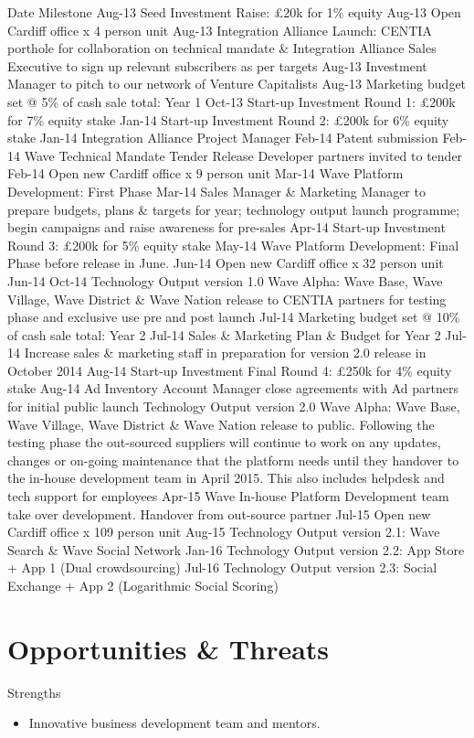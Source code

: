 \documentclass[letterpaper,10pt,openany,oneside,english]{sphinxmanual}
\begin{document}
Date Milestone
Aug-13 Seed Investment Raise: £20k for 1\% equity
Aug-13 Open Cardiff office x 4 person unit
Aug-13 Integration Alliance Launch: CENTIA porthole for collaboration on technical mandate \& Integration Alliance
Sales Executive to sign up relevant subscribers as per targets
Aug-13 Investment Manager to pitch to our network of Venture Capitalists
Aug-13 Marketing budget set @ 5\% of cash sale total: Year 1
Oct-13 Start-up Investment Round 1: £200k for 7\% equity stake
Jan-14 Start-up Investment Round 2: £200k for 6\% equity stake
Jan-14 Integration Alliance Project Manager
Feb-14 Patent submission
Feb-14 Wave Technical Mandate Tender Release \textendash{} Developer partners invited to tender
Feb-14 Open new Cardiff office x 9 person unit
Mar-14 Wave Platform Development: First Phase
Mar-14
Sales Manager \& Marketing Manager to prepare budgets, plans \& targets for year; technology output launch
programme; begin campaigns and raise awareness for pre-sales
Apr-14 Start-up Investment Round 3: £200k for 5\% equity stake
May-14 Wave Platform Development: Final Phase before release in June.
Jun-14 Open new Cardiff office x 32 person unit
Jun-14
Oct-14 Technology Output version 1.0 Wave Alpha: Wave Base, Wave Village, Wave District \& Wave Nation release to
CENTIA partners for testing phase and exclusive use pre and post launch
Jul-14 Marketing budget set @ 10\% of cash sale total: Year 2
Jul-14 Sales \& Marketing Plan \& Budget for Year 2
Jul-14 Increase sales \& marketing staff in preparation for version 2.0 release in October 2014
Aug-14 Start-up Investment Final Round 4: £250k for 4\% equity stake
Aug-14 Ad Inventory Account Manager close agreements with Ad partners for initial public launch
Technology Output version 2.0 Wave Alpha: Wave Base, Wave Village, Wave District \& Wave Nation release to
public. Following the testing phase the out-sourced suppliers will continue to work on any updates, changes
or on-going maintenance that the platform needs until they handover to the in-house development team in
April 2015. This also includes helpdesk and tech support for employees
Apr-15 Wave In-house Platform Development team take over development. Handover from out-source partner
Jul-15 Open new Cardiff office x 109 person unit
Aug-15 Technology Output version 2.1: Wave Search \& Wave Social Network
Jan-16 Technology Output version 2.2: App Store + App 1 (Dual crowdsourcing)
Jul-16 Technology Output version 2.3: Social Exchange + App 2 (Logarithmic Social Scoring)


\section{Opportunities \& Threats}
\label{\detokenize{executive-statement:opportunities-threats}}
Strengths
\begin{itemize}
\item {} 
Innovative business development team and mentors.

\end{itemize}
\end{document}
